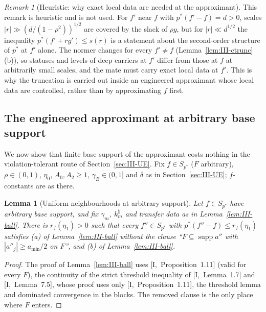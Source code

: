 \documentclass[10pt]{amsart}
\newtheorem{lemma}[theorem]{Lemma}
\theoremstyle{definition}
\theoremstyle{remark}
\newtheorem{remark}[theorem]{Remark}
\newcommand{\supp}{\operatorname{supp}}
\begin{document}
\begin{remark}[Heuristic: why exact local data are needed at the approximant]
\label{rem:III-trunc-heur}
This remark is heuristic and is not used.  For $f'$ near $f$ with
$p^*(f'-f)=d>0$, scales $|r|\gg(d/(1-\rho^2))^{1/2}$ are covered by the slack of
$\rho g$, but for $|r|\ll d^{1/2}$ the inequality $p^*(f'+rg')\le s(r)$ is a
statement about the second-order structure of $p^*$ at $f'$ alone.  The
normer changes for every $f'\neq f$ (Lemma~\ref{lem:III-ctrunc}(b)), so
statuses and levels of deep carriers at $f'$ differ from those at $f$ at
arbitrarily small scales, and the mate must carry exact local data at $f'$.
This is why the truncation is carried out inside an engineered approximant
whose local data are controlled, rather than by approximating $f$ first.
\end{remark}

\subsection{The engineered approximant at arbitrary base support}
\label{subsec:III-UEinf}

We now show that finite base support of the approximant costs nothing in the
violation-tolerant route of Section~\ref{sec:III-UE}.  Fix $f\in S_{p^*}$
($F$ arbitrary), $\rho\in(0,1)$, $\eta_0$, $A_0,A_2\ge1$, $\gamma_B\in(0,1]$ and
$\delta$ as in Section~\ref{sec:III-UE}; $f$-constants are as there.

\begin{lemma}[Uniform neighbourhoods at arbitrary support]\label{lem:III-ballinf}
Let $f\in S_{p^*}$ have arbitrary base support, and fix $\gamma_m$,
$k^\natural_m$ and transfer data as in Lemma~\textup{\ref{lem:III-ball}}.  There
is $r_f(\eta_1)>0$ such that every $f''\in S_{p^*}$ with $p^*(f''-f)\le
r_f(\eta_1)$ satisfies \textup{(a)} of Lemma~\textup{\ref{lem:III-ball}} without
the clause ``$F\subseteq\supp a''$ with $|a''_j|\ge a_{\min}/2$ on $F$'', and
\textup{(b)} of Lemma~\textup{\ref{lem:III-ball}}.
\end{lemma}

\begin{proof}
The proof of Lemma~\ref{lem:III-ball} uses [I,~Proposition~1.11] (valid for
every $F$), the continuity of the strict threshold inequality of
[I,~Lemma~1.7] and [I,~Lemma~7.5], whose proof uses only
[I,~Proposition~1.11], the threshold lemma and dominated convergence in the
blocks.  The removed clause is the only place where $F$ enters.
\end{proof}
\end{document}
